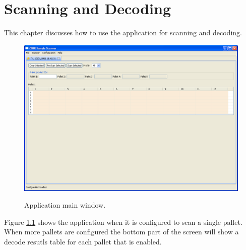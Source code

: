 \chapter{Scanning and Decoding}
This chapter discusses how to use the application for scanning and decoding.

\begin{figure}[H]
  \centering
  \scalebox{0.35}
	   { \includegraphics*{screenshots/scan_and_decode/main_window} }
	   \caption{Application main window.}
	   \label{fig:main_window_2}
\end{figure}
Figure \ref{fig:main_window_2} shows the application when it is configured to
scan a single pallet. When more pallets are configured the bottom part of the
screen will show a decode resutls table for each pallet that is enabled.

